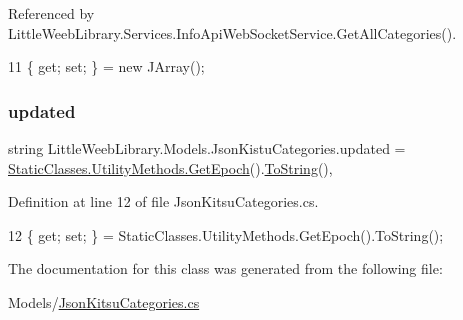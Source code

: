 Referenced by Little\+Weeb\+Library.\+Services.\+Info\+Api\+Web\+Socket\+Service.\+Get\+All\+Categories().


\begin{DoxyCode}
11 \{ \textcolor{keyword}{get}; \textcolor{keyword}{set}; \} = \textcolor{keyword}{new} JArray();
\end{DoxyCode}
\mbox{\label{class_little_weeb_library_1_1_models_1_1_json_kistu_categories_a6ffcd8f9641f421eec961847365f5cb2}} 
\subsubsection{\texorpdfstring{updated}{updated}}
{\footnotesize\ttfamily string Little\+Weeb\+Library.\+Models.\+Json\+Kistu\+Categories.\+updated = \mbox{\hyperlink{class_little_weeb_library_1_1_static_classes_1_1_utility_methods_a12336d9e64983ddabaad8950486fafb2}{Static\+Classes.\+Utility\+Methods.\+Get\+Epoch}}().\mbox{\hyperlink{class_little_weeb_library_1_1_models_1_1_json_kistu_categories_af972fa0332070ba294c5117b95836aa4}{To\+String}}()\hspace{0.3cm}{\ttfamily [get]}, {\ttfamily [set]}}



Definition at line 12 of file Json\+Kitsu\+Categories.\+cs.


\begin{DoxyCode}
12 \{ \textcolor{keyword}{get}; \textcolor{keyword}{set}; \} = StaticClasses.UtilityMethods.GetEpoch().ToString();
\end{DoxyCode}


The documentation for this class was generated from the following file\+:\begin{DoxyCompactItemize}
\item 
Models/\mbox{\hyperlink{_json_kitsu_categories_8cs}{Json\+Kitsu\+Categories.\+cs}}\end{DoxyCompactItemize}
